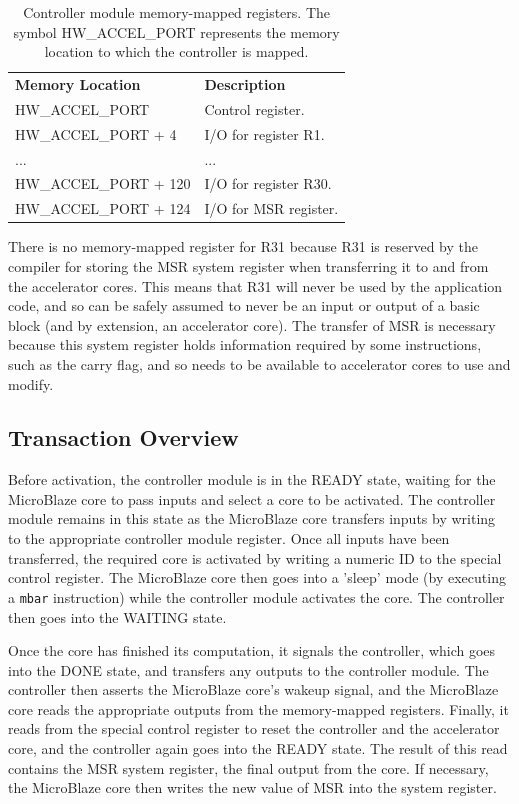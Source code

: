 \documentclass{UoYCSproject}
\begin{document}
\begin{table}[H]
\centering
\begin{tabular}{ |p{6cm}|p{7cm} }
\textbf{Memory Location}   & \textbf{Description}        \\
HW\_ACCEL\_PORT            & Control register.         \\[0.05cm]
HW\_ACCEL\_PORT + 4        & I/O for register R1.      \\[0.05cm]
...                        & ...                       \\[0.05cm]
HW\_ACCEL\_PORT + 120      & I/O for register R30.     \\[0.05cm]
HW\_ACCEL\_PORT + 124      & I/O for MSR register.     \\[0.05cm]
\end{tabular}
\caption{Controller module memory-mapped registers. The symbol HW\_ACCEL\_PORT represents the memory location to which the controller is mapped.}
\label{table:controllerRegisters}
\end{table}

There is no memory-mapped register for R31 because R31 is reserved by the compiler for storing the MSR system register when
transferring it to and from the accelerator cores. This means that R31 will never be used by the application code, and so
can be safely assumed to never be an input or output of a basic block (and by extension, an accelerator core). The transfer
of MSR is necessary because this system register holds information required by some instructions, such as the carry flag,
and so needs to be available to accelerator cores to use and modify.

\subsection{Transaction Overview}

Before activation, the controller module is in the READY state, waiting for the MicroBlaze core to pass inputs and select
a core to be activated. The controller module remains in this state as the MicroBlaze core transfers inputs by writing to
the appropriate controller module register. Once all inputs have been transferred, the required core is activated by writing
a numeric ID to the special control register. The MicroBlaze core then goes into a 'sleep' mode (by executing a \texttt{mbar}
instruction) while the controller module activates the core. The controller then goes into the WAITING state.

Once the core has finished its computation, it signals the controller, which goes into the DONE state, and transfers any outputs
to the controller module. The controller then asserts the MicroBlaze core's wakeup signal, and the MicroBlaze core reads
the appropriate outputs from the memory-mapped registers. Finally, it reads from the special control register to reset the
controller and the accelerator core, and the controller again goes into the READY state. The result of this read contains
the MSR system register, the final output from the core. If necessary, the MicroBlaze core then writes the new value of MSR into
the system register.
\end{document}
